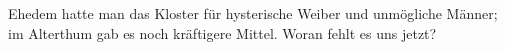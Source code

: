 Ehedem hatte man das Kloster für hysterische Weiber und unmögliche Männer; im Alterthum gab es noch kräftigere Mittel. Woran fehlt es uns jetzt?
\par

